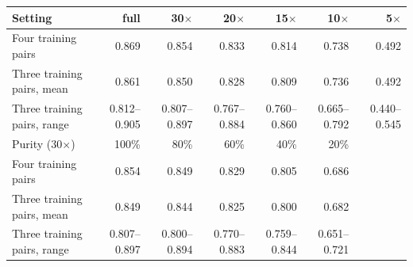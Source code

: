 \begin{tabular}{lrrrrrr}
\toprule
Setting & full & 30$\times$ & 20$\times$ & 15$\times$ & 10$\times$ & 5$\times$ \\
\midrule
Four training pairs & 0.869 & 0.854 & 0.833 & 0.814 & 0.738 & 0.492 \\
Three training pairs, mean & 0.861 & 0.850 & 0.828 & 0.809 & 0.736 & 0.492 \\
Three training pairs, range & 0.812--0.905 & 0.807--0.897 & 0.767--0.884 & 0.760--0.860 & 0.665--0.792 & 0.440--0.545 \\
\midrule
Purity (30$\times$) & 100\% & 80\% & 60\% & 40\% & 20\% &  \\
\midrule
Four training pairs & 0.854 & 0.849 & 0.829 & 0.805 & 0.686 &  \\
Three training pairs, mean & 0.849 & 0.844 & 0.825 & 0.800 & 0.682 &  \\
Three training pairs, range & 0.807--0.897 & 0.800--0.894 & 0.770--0.883 & 0.759--0.844 & 0.651--0.721 &  \\
\bottomrule
\end{tabular}
